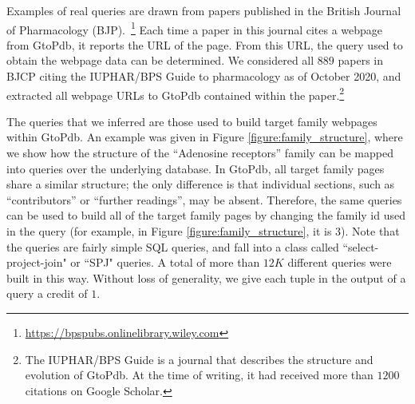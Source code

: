 

Examples of real queries are drawn
from papers published in the British Journal of Pharmacology (BJP).~\footnote{\url{https://bpspubs.onlinelibrary.wiley.com}}  Each time a paper in this journal cites a webpage from GtoPdb, it reports the URL of the page. From this URL, the query used to obtain the webpage data can be determined. 
We considered all $889$ papers in BJCP citing the IUPHAR/BPS Guide to pharmacology \citep{iuphar2018} as of October 2020, and extracted all webpage URLs to GtoPdb contained within the paper.\footnote{The IUPHAR/BPS Guide is a journal that describes the structure and evolution of GtoPdb. At the time of writing, it had received more than $1200$ citations on Google Scholar.}

The queries that we inferred are those used to build target family webpages within GtoPdb.
An example was given in Figure \ref{figure:family_structure}, where we show how the structure of the ``Adenosine receptors'' family can be mapped into  queries over the underlying database. %
In GtoPdb, all target family pages share a similar structure; the only difference is that individual sections, such as ``contributors'' or ``further readings'', may be absent.
Therefore, the same queries can be used to build all of the target family pages by changing the family id used in the query (for example, in Figure \ref{figure:family_structure}, it is 3).
Note that the queries are fairly simple SQL queries, and fall into a class called ``select-project-join" or ``SPJ" queries. 
A total of more than $12K$ different queries were built in this way.
Without loss of generality, we give each tuple in the output of a query a credit of $1$.

